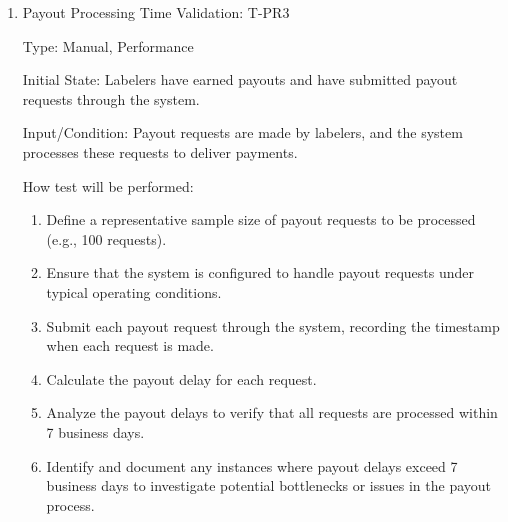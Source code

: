 \documentclass[12pt, titlepage]{article}
\begin{document}
\begin{enumerate}
\item{Payout Processing Time Validation: T-PR3\\}

Type: Manual, Performance

Initial State: Labelers have earned payouts and have submitted payout requests through the system.

Input/Condition: Payout requests are made by labelers, and the system processes these requests to deliver payments.

How test will be performed:
\begin{enumerate}
    \item Define a representative sample size of payout requests to be processed (e.g., 100 requests).
    \item Ensure that the system is configured to handle payout requests under typical operating conditions.
    \item Submit each payout request through the system, recording the timestamp when each request is made.
    \item Calculate the payout delay for each request.
    \item Analyze the payout delays to verify that all requests are processed within 7 business days.
    \item Identify and document any instances where payout delays exceed 7 business days to investigate potential bottlenecks or issues in the payout process.
\end{enumerate}

\end{enumerate}

\end{document}

